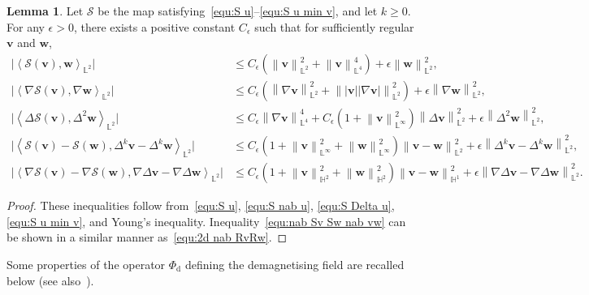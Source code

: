 \documentclass[11pt, reqno]{amsart}
\theoremstyle{definition}
\newtheorem{lemma}[theorem]{Lemma}
\numberwithin{equation}{section}
\newcommand{\bff}{\boldsymbol}
\newcommand{\bb}{\mathbb}
\newcommand{\norm}[2]{\left\|{#1}\right\|_{#2}}
\newcommand{\inpro}[2]{\left\langle#1,#2\right\rangle}
\begin{document}
\begin{lemma}
Let $\mathcal{S}$ be the map satisfying~\eqref{equ:S u}--\eqref{equ:S u min v}, and let $k\geq 0$. For any $\epsilon>0$, there exists a positive constant $C_\epsilon$ such that for sufficiently regular $\bff{v}$ and $\bff{w}$,
\begin{align}
	\label{equ:Sv w}
	\big| \inpro{\mathcal{S}(\bff{v})}{\bff{w}}_{\bb{L}^2} \big|
	&\leq
	C_\epsilon \left(\norm{\bff{v}}{\bb{L}^2}^2 +\norm{\bff{v}}{\bb{L}^4}^4\right) + \epsilon \norm{\bff{w}}{\bb{L}^2}^2,
	\\
	\label{equ:nab Sv nab w}
	\big| \inpro{\nabla \mathcal{S}(\bff{v})}{\nabla \bff{w}}_{\bb{L}^2} \big|
	&\leq
	C_\epsilon \left(\norm{\nabla \bff{v}}{\bb{L}^2}^2 +\norm{|\bff{v}| |\nabla\bff{v}|}{\bb{L}^2}^2\right) + \epsilon \norm{\nabla \bff{w}}{\bb{L}^2}^2,
	\\
	\label{equ:Sv Delta2 w}
	\big| \inpro{\Delta \mathcal{S}(\bff{v})}{\Delta^2 \bff{w}}_{\bb{L}^2} \big| 
	&\leq
	C_\epsilon \norm{\nabla \bff{v}}{\bb{L}^4}^4 + C_\epsilon \left(1+\norm{\bff{v}}{\bb{L}^\infty}^2 \right) \norm{\Delta \bff{v}}{\bb{L}^2}^2
	+
	\epsilon \norm{\Delta^2 \bff{w}}{\bb{L}^2}^2,
	\\
	\label{equ:Sv Sw v min w}
	\Big| \inpro{\mathcal{S}(\bff{v})-\mathcal{S}(\bff{w})}{\Delta^k \bff{v}- \Delta^k \bff{w}}_{\bb{L}^2} \Big|
	&\leq
	C_\epsilon \left(1+\norm{\bff{v}}{\bb{L}^\infty}^2 + \norm{\bff{w}}{\bb{L}^\infty}^2 \right) \norm{\bff{v}-\bff{w}}{\bb{L}^2}^2 
	+
	\epsilon \norm{\Delta^k \bff{v}- \Delta^k \bff{w}}{\bb{L}^2}^2,
	\\
	\label{equ:nab Sv Sw nab vw}
	\Big| \inpro{\nabla \mathcal{S}(\bff{v})- \nabla \mathcal{S}(\bff{w})}{\nabla \Delta \bff{v}- \nabla \Delta \bff{w}}_{\bb{L}^2} \Big|
	&\leq
	C_\epsilon \left(1+ \norm{\bff{v}}{\bb{H}^2}^2 + \norm{\bff{w}}{\bb{H}^2}^2 \right) \norm{\bff{v}-\bff{w}}{\bb{H}^1}^2
	+
	\epsilon \norm{\nabla\Delta \bff{v}- \nabla \Delta \bff{w}}{\bb{L}^2}^2.
\end{align}
\end{lemma}

\begin{proof}
These inequalities follow from~\eqref{equ:S u}, \eqref{equ:S nab u}, \eqref{equ:S Delta u}, \eqref{equ:S u min v}, and Young's inequality. Inequality~\eqref{equ:nab Sv Sw nab vw} can be shown in a similar manner as~\eqref{equ:2d nab RvRw}.
\end{proof}

Some properties of the operator $\Phi_{\mathrm{d}}$ defining the demagnetising field are recalled below (see also~\cite{Pra04}).
\end{document}
